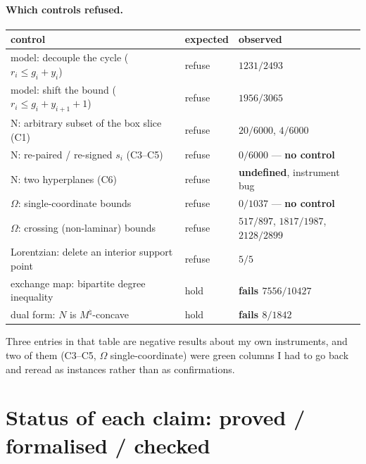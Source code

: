 \documentclass[11pt]{article}
\theoremstyle{plain}
\theoremstyle{definition}
\begin{document}
\paragraph{Which controls refused.}
\begin{center}
\begin{tabular}{lll}
\textbf{control} & \textbf{expected} & \textbf{observed}\\\hline
model: decouple the cycle ($r_i\le g_i+y_i$) & refuse & $1231/2493$\\
model: shift the bound ($r_i\le g_i+y_{i+1}+1$) & refuse & $1956/3065$\\
N: arbitrary subset of the box slice (C1) & refuse & $20/6000$, $4/6000$\\
N: re-paired / re-signed $s_i$ (C3--C5) & refuse & $0/6000$ --- \textbf{no control}\\
N: two hyperplanes (C6) & refuse & \textbf{undefined}, instrument bug\\
$\Omega$: single-coordinate bounds & refuse & $0/1037$ --- \textbf{no control}\\
$\Omega$: crossing (non-laminar) bounds & refuse & $517/897$, $1817/1987$, $2128/2899$\\
Lorentzian: delete an interior support point & refuse & $5/5$\\
exchange map: bipartite degree inequality & hold & \textbf{fails $7556/10427$}\\
dual form: $N$ is $M^\natural$-concave & hold & \textbf{fails $8/1842$}\\
\end{tabular}
\end{center}
Three entries in that table are negative results about my own instruments, and two of
them (C3--C5, $\Omega$ single-coordinate) were green columns I had to go back and reread
as instances rather than as confirmations.

\section{Status of each claim: proved / formalised / checked}
\end{document}
